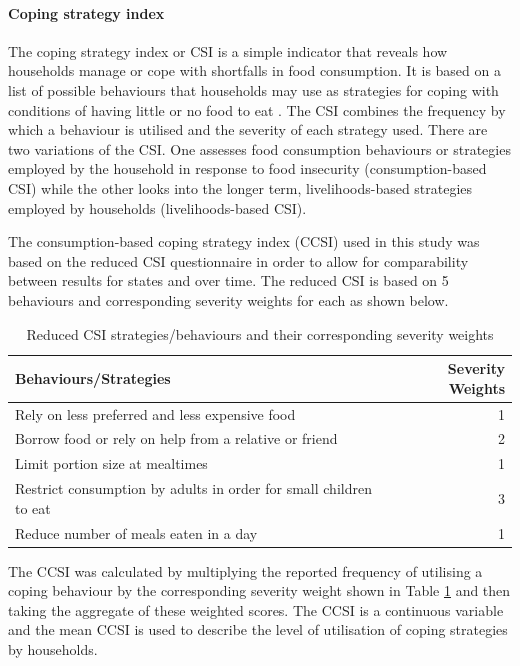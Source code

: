 \documentclass[12pt,a4paper]{article}
\let\oldparagraph\paragraph
\renewcommand{\paragraph}[1]{\oldparagraph{#1}\mbox{}}
\begin{document}
\hypertarget{csi}{%
\paragraph{Coping strategy index}\label{csi}}

The coping strategy index or CSI is a simple indicator that reveals how households manage or cope with shortfalls in food consumption. It is based on a list of possible behaviours that households may use as strategies for coping with conditions of having little or no food to eat \citep{Maxwell:2008vh}. The CSI combines the frequency by which a behaviour is utilised and the severity of each strategy used. There are two variations of the CSI. One assesses food consumption behaviours or strategies employed by the household in response to food insecurity (consumption-based CSI) while the other looks into the longer term, livelihoods-based strategies employed by households (livelihoods-based CSI).

The consumption-based coping strategy index (CCSI) used in this study was based on the reduced CSI questionnaire in order to allow for comparability between results for states and over time. The reduced CSI is based on 5 behaviours and corresponding severity weights for each as shown below.

\begin{table}[H]

\caption{\label{tab:csi1}Reduced CSI strategies/behaviours and their corresponding severity weights}
\centering
\begin{tabular}[t]{lr}
\toprule
\textbf{Behaviours/Strategies} & \textbf{Severity Weights}\\
\midrule
\rowcolor{gray!6}  Rely on less preferred and less expensive food & 1\\
Borrow food or rely on help from a relative or friend & 2\\
\rowcolor{gray!6}  Limit portion size at mealtimes & 1\\
Restrict consumption by adults in order for small children to eat & 3\\
\rowcolor{gray!6}  Reduce number of meals eaten in a day & 1\\
\bottomrule
\end{tabular}
\end{table}

The CCSI was calculated by multiplying the reported frequency of utilising a coping behaviour by the corresponding severity weight shown in Table \ref{tab:csi1} and then taking the aggregate of these weighted scores. The CCSI is a continuous variable and the mean CCSI is used to describe the level of utilisation of coping strategies by households.
\end{document}
